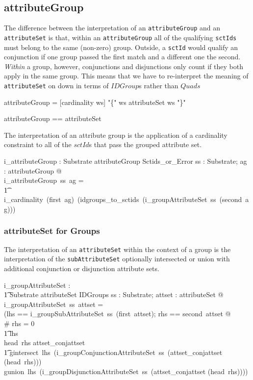 \documentclass{article}
\def\spec#1{{\tt #1}}
\def\bnf#1{{\scriptsize {{#1}} }}
\begin{document}
\subsection{attributeGroup}
The difference between the interpretation of an \spec{attributeGroup} and an \spec{attributeSet} is that, within an \spec{attributeGroup} all of the 
qualifying \spec{sctIds} must belong to the same (non-zero) group.  Outside, a \spec{sctId} would qualify an conjunction if one group passed the first match
and a different one the second.  \emph{Within} a group, however, conjunctions and disjunctions only count if they both apply in the same group.  This means
that we have to re-interpret the meaning of \spec{attributeSet} on down in terms of $IDGroup$s rather than $Quads$

\begin{framed}
\noindent
\bnf{attributeGroup = [cardinality ws] "\{" ws attributeSet ws "\}"}
\end{framed}

\begin{zed}
attributeGroup == \optional[cardinality] \cross attributeSet
\end{zed}

The interpretation of an attribute group is the application of a cardinality constraint to all of the $sctId$s that pass the grouped 
attribute set.

\begin{gendef}
   i\_attributeGroup : Substrate \fun attributeGroup \fun Sctids\_or\_Error
\where
   \forall ss : Substrate; ag : attributeGroup @ \\
   i\_attributeGroup~ss~ag = \\
   \t1  i\_cardinality~(first~ag)~(idgroups\_to\_sctids~(i\_groupAttributeSet~ss~(second~ag)))
\end{gendef}

\subsubsection{attributeSet for Groups}
The interpretation of an \spec{attributeSet} within the context of a group is the interpretation of the \spec{subAttributeSet}
optionally intersected or union with additional conjunction or disjunction attribute sets.

\begin{gendef}
   i\_groupAttributeSet : \\
\t1 Substrate \fun attributeSet \fun IDGroups
\where
   \forall ss : Substrate; attset : attributeSet @ \\
   i\_groupAttributeSet~ss~attset = \\
   (\LET lhs == i\_groupSubAttributeSet~ss~(first~attset); rhs == second~attset @ \\
 \IF \# rhs = 0 \\
\t1 \THEN lhs \\
 \ELSE \IF head~rhs \in \ran attset\_conjattset \\
\t1 \THEN gintersect~lhs~(i\_groupConjunctionAttributeSet~ss~(attset\_conjattset \inv (head~rhs))) \\
  \ELSE gunion~lhs~(i\_groupDisjunctionAttributeSet~ss~(attset\_conjattset \inv (head~rhs))))
\end{gendef}
\end{document}
